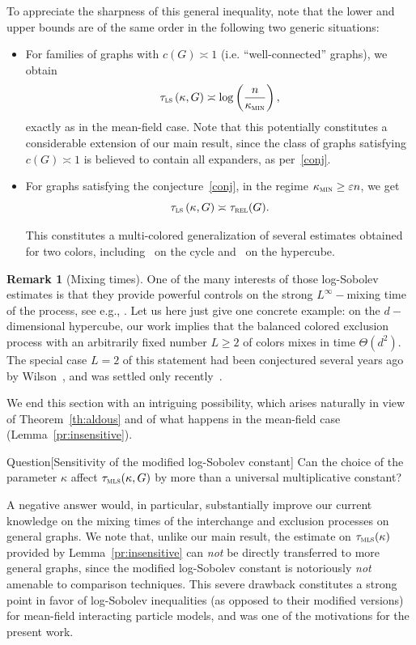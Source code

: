 \documentclass[10pt]{amsart}
\theoremstyle{definition}\newtheorem{defi}[theo]{Definition}\newtheorem{rema}[theo]{Remark}\newtheorem{exam}[theo]{Example}\newtheorem{exem}[theo]{Example}\newtheorem{nota}[theo]{Notation}
\newcommand{\trel}{\tau_{\textsc{rel}}}
\newcommand{\tmls}{\tau_{\textsc{mls}}}
\newcommand{\tls}{\tau_{\textsc{ls}}}
\newcommand{\am}{{\kappa_{\textsc{min}}}}
\begin{document}
To appreciate the sharpness of this general inequality, note that the lower and upper bounds are of the same order in the following two generic situations:
\begin{itemize}
\item For families of graphs with $c(G)\asymp 1$ (i.e. ``well-connected'' graphs), we obtain
\[
\tls\left(\kappa, G\right) \asymp \log\left(\frac{n}{\am}\right),
\]
exactly as in the mean-field case. Note that this potentially constitutes a considerable extension of our main result, since the class of graphs satisfying $c(G)\asymp 1$ is believed to contain all expanders, as per~\eqref{conj}.
\item For graphs satisfying the conjecture~\eqref{conj}, in the regime $\am\ge \varepsilon n$, we get
\[
\tls\left(\kappa, G\right) \asymp \trel(G).
\]

This constitutes a multi-colored generalization of several estimates obtained for two colors, including~\cite[Theorem~4]{MR1675008} on the cycle and~\cite[Corollary~2.6]{2019arXiv190502146H} on the hypercube.
\end{itemize}


\begin{rema}[Mixing times]
One of the many interests of those log-Sobolev estimates is that they provide powerful controls on the strong $L^\infty-$mixing time of the process, see e.g., \cite{MR2341319}. Let us here just give one concrete example: on the $d-$dimensional hypercube, our work implies that the balanced colored exclusion process with an arbitrarily fixed number $L\ge 2$ of colors mixes in time $\Theta(d^2)$. The special case $L=2$ of this statement had been conjectured several years ago by Wilson~\cite{MR2023023}, and was settled only recently~\cite{hermon2018exclusion}.
\end{rema}

We end this section with an intriguing possibility, which arises naturally in view of Theorem~\ref{th:aldous} and of what happens in the mean-field case (Lemma~\ref{pr:insensitive}).


\begin{enonce}{Question}[Sensitivity of the modified log-Sobolev constant]
Can the choice of the parameter $\kappa$ affect $\tmls(\kappa,G)$ by more than a universal multiplicative constant?
\end{enonce}

A negative answer would, in particular, substantially improve our current knowledge on the mixing times of the interchange and exclusion processes on general graphs. We note that, unlike our main result, the estimate on $\tmls(\kappa)$ provided by Lemma~\ref{pr:insensitive} can \emph{not} be directly transferred to more general graphs, since the modified log-Sobolev constant is notoriously \emph{not} amenable to comparison techniques. This severe drawback constitutes a strong point in favor of log-Sobolev inequalities (as opposed to their modified versions) for mean-field interacting particle models, and was one of the motivations for the present work.
\end{document}
